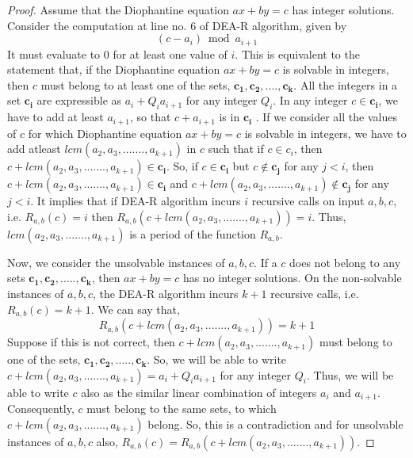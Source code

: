 \documentclass[pdflatex,sn-mathphys-num]{sn-jnl}%
\theoremstyle{thmstyleone}%
\theoremstyle{thmstyletwo}%
\theoremstyle{thmstylethree}%
\begin{document}
\begin{proof}

Assume that the Diophantine equation $ax+by=c$ has integer solutions. Consider the computation at line no. 6 of DEA-R algorithm, given by 
$$
(c-a_i) \bmod a_{i+1}
$$
It must evaluate to 0 for at least one value of $i$. 
This is equivalent to the statement that, if the Diophantine equation $ax+by=c$ is solvable in integers, then $c$ must belong to at least one of the sets, $\mathbf{c_1},\mathbf{c_2},....,\mathbf{c_k}$. All the integers in a set $\mathbf{c_i}$ are expressible as $a_i+Q_ia_{i+1}$ for any integer $Q_i$. In any integer $c\in \mathbf{c_i}$, we have to add at least $a_{i+1}$, so that $c+a_{i+1}$ is in $\mathbf{c_i}$ . If we consider all the values of $c$ for which Diophantine equation $ax+by=c$ is solvable in integers, we have to add atleast $lcm(a_2,a_3,.......,a_{k+1})$ in $c$ such that if $c\in c_i$, then $c+lcm(a_2,a_3,.......,a_{k+1})\in \mathbf{c_i}$. So, if $c \in \mathbf{c_i}$ but $c \notin \mathbf{c_j}$ for any $j<i$, then $c+lcm(a_2,a_3,.......,a_{k+1})\in \mathbf{c_i}$ and $c+lcm(a_2,a_3,.......,a_{k+1})\notin \mathbf{c_j}$ for any $j<i$. It implies that if DEA-R algorithm incurs $i$ recursive calls on input $a,b,c$, i.e. $R_{a,b}(c)=i$ then $R_{a,b}(c+lcm(a_2,a_3,.......,a_{k+1}))=i$.  Thus, $lcm(a_2,a_3,.......,a_{k+1})$ is a period of the function $R_{a,b}$. 
\par Now, we consider the unsolvable instances of $a,b,c$. If a $c$ does not belong to any sets $\mathbf{c_1}, \mathbf{c_2},.....,\mathbf{c_k}$, then $ax+by=c$ has no integer solutions. On the non-solvable instances of $a,b,c$, the DEA-R algorithm incurs $k+1$ recursive calls, i.e. $R_{a,b}(c)=k+1$. We can say that, $$R_{a,b}(c+lcm(a_2,a_3,.......,a_{k+1}))=k+1$$ Suppose if this is not correct, then $c+lcm(a_2,a_3,.......,a_{k+1})$ must belong to one of the sets, $\mathbf{c_1}, \mathbf{c_2},.....,\mathbf{c_k}$. So, we will be able to write $c+lcm(a_2,a_3,.......,a_{k+1})=a_i+Q_ia_{i+1}$ for any integer $Q_i$. Thus, we will be able to write $c$ also as the similar linear combination of integers $a_i$ and $a_{i+1}$. Consequently, $c$ must belong to the same sets, to which  $c+lcm(a_2,a_3,.......,a_{k+1})$ belong. So, this is a contradiction and for unsolvable instances of $a,b,c$ also, $R_{a,b}(c)=R_{a,b}(c+lcm(a_2,a_3,.......,a_{k+1}))$. 

\end{proof}
\end{document}
